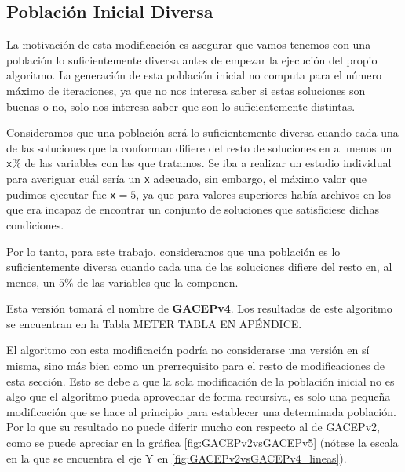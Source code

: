 \subsection{Población Inicial Diversa}

La motivación de esta modificación es asegurar que vamos tenemos con una población lo suficientemente diversa antes de empezar la ejecución del propio algoritmo. 
La generación de esta población inicial no computa para el número máximo de iteraciones, ya que no nos interesa saber si estas soluciones son buenas o no, solo nos interesa saber que son lo suficientemente distintas. 

Consideramos que una población será lo suficientemente diversa cuando cada una de las soluciones que la conforman difiere del resto de soluciones en al menos un \texttt{x}\% de las variables con las que tratamos. 
Se iba a realizar un estudio individual para averiguar cuál sería un \texttt{x} adecuado, sin embargo, el máximo valor que pudimos ejecutar fue \texttt{x}$=5$, ya que para valores superiores había archivos en los que era incapaz de encontrar un conjunto de soluciones que satisficiese dichas condiciones. 

Por lo tanto, para este trabajo, consideramos que una población es lo suficientemente diversa cuando cada una de las soluciones difiere del resto en, al menos, un $5\%$ de las variables que la componen. 

Esta versión tomará el nombre de \textbf{GACEPv4}. 
Los resultados de este algoritmo se encuentran en la Tabla \color{red}METER TABLA EN APÉNDICE\color{black}.

El algoritmo con esta modificación podría no considerarse una versión en sí misma, sino más bien como un prerrequisito para el resto de modificaciones de esta sección. 
Esto se debe a que la sola modificación de la población inicial no es algo que el algoritmo pueda aprovechar de forma recursiva, es solo una pequeña modificación que se hace al principio para establecer una determinada población. 
Por lo que su resultado no puede diferir mucho con respecto al de GACEPv2, como se puede apreciar en la gráfica \ref{fig:GACEPv2vsGACEPv5} (nótese la escala en la que se encuentra el eje Y en \ref{fig:GACEPv2vsGACEPv4_lineas}). 


